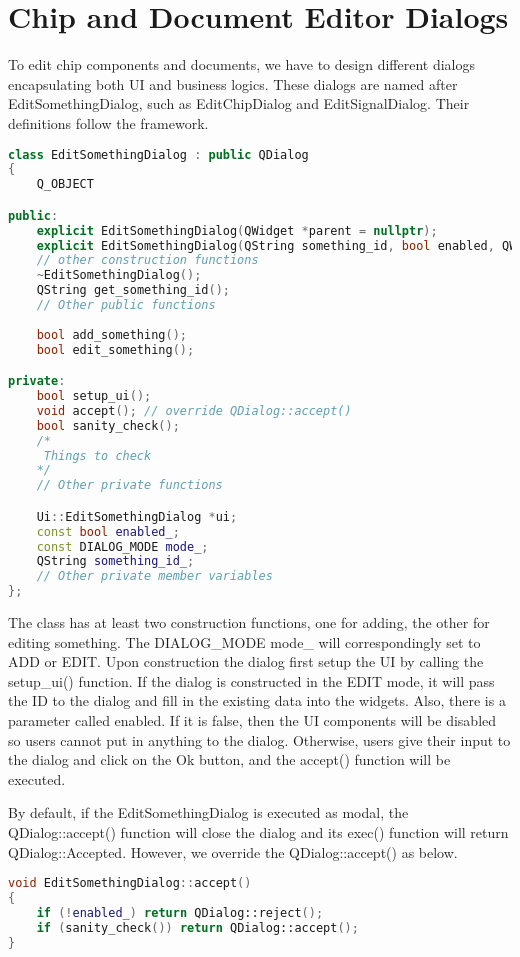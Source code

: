 \section{Chip and Document Editor Dialogs}
To edit chip components and documents, we have to design different dialogs encapsulating both UI and business logics. These dialogs are named after EditSomethingDialog, such as EditChipDialog and EditSignalDialog. Their definitions follow the framework.

\begin{lstlisting}[language=C++]
class EditSomethingDialog : public QDialog
{
    Q_OBJECT

public:
    explicit EditSomethingDialog(QWidget *parent = nullptr);
    explicit EditSomethingDialog(QString something_id, bool enabled, QWidget *parent = nullptr);
    // other construction functions
    ~EditSomethingDialog();
    QString get_something_id();
    // Other public functions
    
    bool add_something();
    bool edit_something();

private:
    bool setup_ui();
    void accept(); // override QDialog::accept()
    bool sanity_check();
    /*
     Things to check
    */
    // Other private functions

    Ui::EditSomethingDialog *ui;
    const bool enabled_;
    const DIALOG_MODE mode_;
    QString something_id_;
    // Other private member variables 
};
\end{lstlisting}

The class has at least two construction functions, one for adding, the other for editing something. The DIALOG\_MODE mode\_ will correspondingly set to ADD or EDIT. Upon construction the dialog first setup the UI by calling the setup\_ui() function. If the dialog is constructed in the EDIT mode, it will pass the ID to the dialog and fill in the existing data into the widgets. Also, there is a parameter called enabled. If it is false, then the UI components will be disabled so users cannot put in anything to the dialog. Otherwise, users give their input to the dialog and click on the Ok button, and the accept() function will be executed. 

By default, if the EditSomethingDialog is executed as modal, the QDialog::accept() function will close the dialog and its exec() function will return QDialog::Accepted. However, we override the QDialog::accept() as below.

\begin{lstlisting}[language=C++]
void EditSomethingDialog::accept()
{
    if (!enabled_) return QDialog::reject();
    if (sanity_check()) return QDialog::accept();
}
\end{lstlisting}

